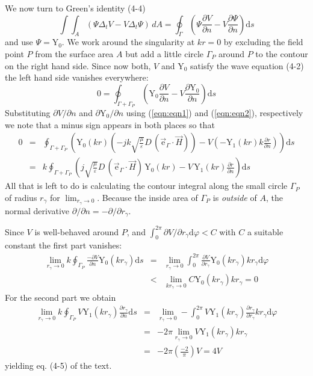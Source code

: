 \documentclass[10pt,notitlepage,letterpaper,landscape,twocolumn]{article}
\newcommand{\besY}{\mathrm{Y}}
\newcommand{\eg}{\vec{\mathrm{e}}_\Gamma}
\newcommand{\eqnr}[1]{(\ref{eqn:#1})}
\newcommand{\dd}{\mathrm{d}}
\begin{document}
We now turn to Green's identity (4-4)
\begin{displaymath}
	\int\!\!\!\int_A\!\! \left(\Psi\Delta_t V - V \Delta_t \Psi\right)\, dA
	= \oint_\Gamma
		\left(
			\Psi \frac{\partial V}{\partial n}
	   -    V    \frac{\partial \Psi}{\partial n}
	    \right)
		\dd s
\end{displaymath}
and use $\Psi=\besY_0$. We work around the singularity at $kr=0$ by excluding
the field point $P$ from the surface area $A$ but add a little circle $\Gamma_P$
around $P$ to the contour on the right hand side. Since now both, $V$ and $\besY_0$
satisfy the wave equation (4-2) the left hand side vanishes everywhere:
\begin{displaymath}
	0 = \oint_{\Gamma + \Gamma_P}
		\left(
			\besY_0 \frac{\partial V}{\partial n}
	   -    V    \frac{\partial \besY_0}{\partial n}
	    \right)
		\dd s
\end{displaymath}
Substituting $\partial V/\partial n$  and $\partial \besY_0/\partial n$
using \eqnr{eqn1} and \eqnr{eqn2}, respectively we note that a minus sign
appears in both places so that
\begin{eqnarray*}
	0 & = & \oint_{\Gamma + \Gamma_P}
		\left(
		\besY_0(kr)
          \left(-j k \sqrt{\frac{\mu}{\varepsilon}} D\, (\eg\cdot\vec{H})\right)
	   -    V   
        \left( - \besY_1(kr) k \frac{\partial r}{\partial n} \right)
	    \right)
		\dd s
\\
	 & = & k \oint_{\Gamma + \Gamma_P}
		\left(
          j \sqrt{\frac{\mu}{\varepsilon}} D\, (\eg\cdot\vec{H})\, \besY_0(kr)
	   -    V\, 
         \besY_1(kr) \frac{\partial r}{\partial n}
	    \right)
		\dd s
\end{eqnarray*}
All that is left to do is calculating the contour integral along the small
circle $\Gamma_P$ of radius $r_\gamma$ for $\lim_{r_\gamma \rightarrow 0}$.
Because the inside area of $\Gamma_P$ is {\em outside} of $A$, the normal
derivative $\partial/\partial n = -\partial/\partial r_\gamma$.

Since $V$ is well-behaved around $P$, and
$\int_0^{2 \pi} \partial V /\partial r_\gamma \dd \varphi < C$ with
$C$ a suitable constant the first part vanishes:
\begin{eqnarray*}
\lim_{r_\gamma\rightarrow 0}
k \oint_{\Gamma_P}\!\!\! \frac{-\partial V}{\partial n} \besY_0(k r_\gamma) \dd s
 & = &
\lim_{r_\gamma\rightarrow 0}
\int_0^{2 \pi}\!\!\!
       \frac{\partial V}{\partial r_\gamma} \besY_0(k r_\gamma) k r_\gamma \dd \varphi
\\ & < &
\lim_{kr_\gamma\rightarrow 0}
C \besY_0(k r_\gamma) k r_\gamma
= 0
\end{eqnarray*}
For the second part we obtain
\begin{eqnarray*}
\lim_{r_\gamma\rightarrow 0}
k \oint_{\Gamma_P}\!\!\!
         V
         \besY_1(kr_\gamma) \frac{\partial r_\gamma}{\partial n}
		 \dd s
& = &
\lim_{r_\gamma\rightarrow 0}
- \int_0^{2 \pi}
	V
    \besY_1(kr_\gamma) \frac{\partial r_\gamma}{\partial r_\gamma}
	k r_\gamma
	\dd \varphi
\\ 
& = &
- 2 \pi 
\lim_{r_\gamma\rightarrow 0}
	V
    \besY_1(kr_\gamma)
	k r_\gamma
\\
& = & - 2 \pi \left(\frac{-2}{\pi}\right) V = 4 V
\end{eqnarray*}
yielding eq. (4-5) of the text.
\end{document}
